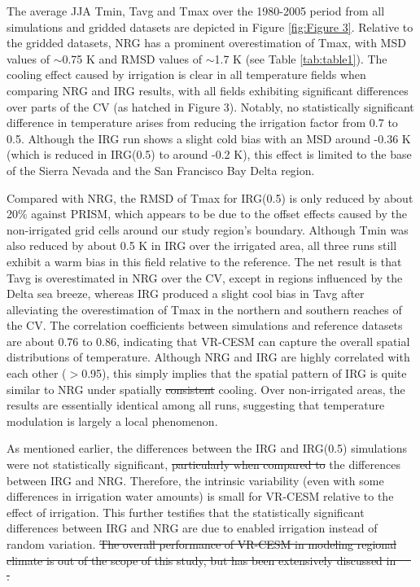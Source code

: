 \documentclass[draft,ms]{agutex}   %
\providecommand{\DIFadd}[1]{{\protect\color{blue}\uwave{#1}}} %
\providecommand{\DIFdel}[1]{{\protect\color{red}\sout{#1}}}                      %
\providecommand{\DIFaddbegin}{} %
\providecommand{\DIFaddend}{} %
\providecommand{\DIFdelbegin}{} %
\providecommand{\DIFdelend}{} %
\begin{document}
\begin{article}
The average JJA Tmin, Tavg and Tmax over the 1980-2005 period from all simulations and gridded datasets are depicted in Figure \ref{fig:Figure 3}. Relative to the gridded datasets, NRG has a prominent overestimation of Tmax, with MSD values of $\sim$0.75 K and RMSD values of $\sim$1.7 K (see Table \ref{tab:table1}). The cooling effect caused by irrigation is clear in all temperature fields when comparing NRG and IRG results, with all fields exhibiting significant differences over parts of the CV (as hatched in Figure 3). Notably, no statistically significant difference in temperature arises from reducing the irrigation factor from 0.7 to 0.5. Although the IRG run shows a slight cold bias with an MSD around -0.36 K (which is reduced in IRG(0.5) to around -0.2 K), this effect is limited to the base of the Sierra Nevada and the San Francisco Bay Delta region.

Compared with NRG, the RMSD of Tmax for IRG(0.5) is only reduced by about 20$\%$ against PRISM, which appears to be due to the offset effects caused by the non-irrigated grid cells around our study region's boundary. Although Tmin was also reduced by about 0.5 K in IRG over the irrigated area, all three runs still exhibit a warm bias in this field relative to the reference. The net result is that Tavg is overestimated in NRG over the CV, except in regions influenced by the Delta sea breeze, whereas IRG produced a slight cool bias in Tavg after alleviating the overestimation of Tmax in the northern and southern reaches of the CV. The correlation coefficients between simulations and reference datasets are about 0.76 to 0.86, indicating that VR-CESM can capture the overall spatial distributions of temperature. Although NRG and IRG are highly correlated with each other ($>$0.95), this simply implies that the spatial pattern of IRG is quite similar to NRG under spatially \DIFdelbegin \DIFdel{consistent }\DIFdelend \DIFaddbegin \DIFadd{uniform }\DIFaddend cooling. Over non-irrigated areas, the results are essentially identical among all runs, suggesting that temperature modulation is largely a local phenomenon.

As mentioned earlier, the differences \DIFaddbegin {\color{red}\DIFadd{in temperature}} \DIFaddend between the IRG and IRG(0.5) simulations were not statistically significant, \DIFdelbegin \DIFdel{particularly when compared to }\DIFdelend \DIFaddbegin \DIFadd{and were much smaller than }\DIFaddend the differences between IRG and NRG. Therefore, the intrinsic variability (even with some differences in irrigation water amounts) is small for VR-CESM relative to the effect of irrigation. This further testifies that the statistically significant differences between IRG and NRG are due to enabled irrigation instead of random variation.
\DIFdelbegin \DIFdel{The overall performance of VR-CESM in modeling regional climate is out of the scope of this study, but has been extensively discussed in \mbox{%
\citep{huang2016evaluation}
}%
.
}\DIFdelend 


\end{article}
\end{document}
